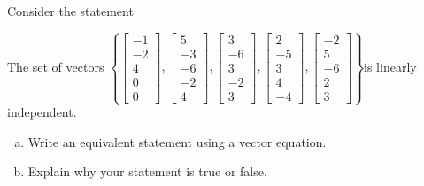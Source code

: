 
\begin{exerciseStatement}


Consider the statement 
\begin{center}\begin{minipage}{0.8\textwidth}
 The set of vectors \( \left\{ \left[\begin{array}{c}
-1 \\
-2 \\
4 \\
0 \\
0
\end{array}\right] , \left[\begin{array}{c}
5 \\
-3 \\
-6 \\
-2 \\
4
\end{array}\right] , \left[\begin{array}{c}
3 \\
-6 \\
3 \\
-2 \\
3
\end{array}\right] , \left[\begin{array}{c}
2 \\
-5 \\
3 \\
4 \\
-4
\end{array}\right] , \left[\begin{array}{c}
-2 \\
5 \\
-6 \\
2 \\
3
\end{array}\right] \right\} \)is linearly independent.
\end{minipage}\end{center}
    


\begin{enumerate}[(a)]
\item  Write an equivalent statement using a vector equation.
\item  Explain why your statement is true or false.
\end{enumerate}
    
\end{exerciseStatement}
    
